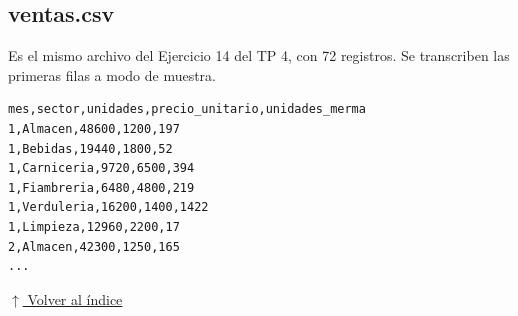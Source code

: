 \documentclass[12pt]{article}
\newcommand{\volverindice}{%
    \vspace{1em}%
    \begin{flushright}%
        \hyperlink{indice}{\small $\uparrow$ Volver al índice}%
    \end{flushright}%
}
\begin{document}


\subsection{ventas.csv}

Es el mismo archivo del Ejercicio 14 del TP 4, con 72 registros. Se transcriben las primeras filas a modo de muestra.

\begin{lstlisting}[style=salida]
mes,sector,unidades,precio_unitario,unidades_merma
1,Almacen,48600,1200,197
1,Bebidas,19440,1800,52
1,Carniceria,9720,6500,394
1,Fiambreria,6480,4800,219
1,Verduleria,16200,1400,1422
1,Limpieza,12960,2200,17
2,Almacen,42300,1250,165
...
\end{lstlisting}

\volverindice
\end{document}
